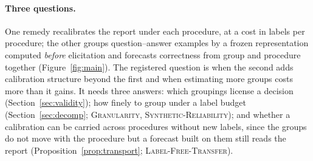 \documentclass[11pt]{article}
\theoremstyle{definition}
\theoremstyle{remark}
\newcommand{\1}{\mathbf{1}}
\newcommand{\expname}[1]{\textsc{#1}}
\begin{document}
\paragraph{Three questions.} One remedy recalibrates the report under each procedure, at a cost in labels per
procedure; the other groups question--answer examples by a frozen representation computed \emph{before}
elicitation and forecasts correctness from group and procedure together (Figure~\ref{fig:main}). The registered
question is when the second adds calibration structure beyond the first and when estimating more groups costs
more than it gains. It needs three answers: which groupings license a decision (Section~\ref{sec:validity}); how
finely to group under a label budget (Section~\ref{sec:decomp}; \expname{Granularity}, \expname{Synthetic-Reliability}); and
whether a calibration can be carried across procedures without new labels, since the groups do not move with
the procedure but a forecast built on them still reads the report (Proposition~\ref{prop:transport};
\expname{Label-Free-Transfer}).

\end{document}
